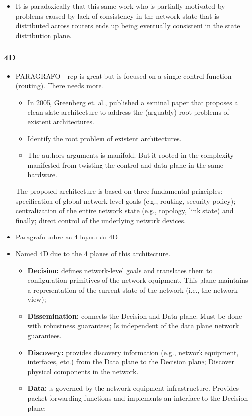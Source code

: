 \begin{itemize}
\item It is paradoxically that this same work who is partially motivated by problems caused by lack of consistency in the network state that is distributed across routers ends up being eventually consistent in the state distribution plane. 
\end{itemize}

\subsubsection{4D}


\begin{itemize}
\item  PARAGRAFO - \gls{rcp} is great but is focused on a single control function (routing). There needs more. 
  \begin{itemize}
     \item In 2005, Greenberg et. al., published a seminal paper that proposes a clean slate architecture to address the (arguably) root problems of existent architectures. 
     \item Identify the root problem of existent architectures. 
     \item The authors arguments is manifold. But it rooted in the complexity manifested from twisting the control and data plane in the same hardware. 
  \end{itemize}


The proposed architecture is based on three fundamental principles: specification of  global network level goals (e.g., routing, security policy);  centralization of the entire network state (e.g., topology, link state) and finally; direct control of the underlying network devices. 

\item Paragrafo sobre as 4 layers do 4D

\item Named 4D due to the 4 planes of this architecture. 

\begin{itemize}
\item[] \textbf{Decision:}  defines network-level goals and 
  translates them to configuration primitives of the network
  equipment. This plane maintains a representation of the current state of the network (i.e., the network view); 
\item[] \textbf{Dissemination:}  connects the Decision and Data plane. Must be
  done with robustness guarantees; Is independent of the data plane network guarantees. 
\item[] \textbf{Discovery:} provides discovery information (e.g., network
  equipment, interfaces, etc.) from the Data plane to the Decision plane; Discover physical components in the network. 
\item[] \textbf{Data:}  is governed by the network equipment
  infrastructure. Provides packet forwarding functions and implements
  an interface to the Decision plane;  
\end{itemize}



\end{itemize}
